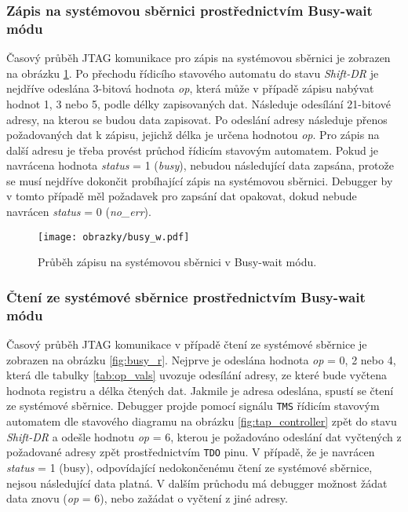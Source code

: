 \subsubsection{Zápis na systémovou sběrnici prostřednictvím Busy-wait módu} 
Časový průběh JTAG komunikace pro zápis na systémovou sběrnici je zobrazen na obrázku \ref{fig:busy_w}. Po přechodu řídicího stavového automatu do stavu \textit{Shift-DR} je nejdříve odeslána 3-bitová hodnota \textit{op}, která může v případě zápisu nabývat hodnot 1, 3 nebo 5, podle délky zapisovaných dat. Následuje odesílání 21-bitové adresy, na kterou se budou data zapisovat. Po odeslání adresy následuje přenos požadovaných dat k zápisu, jejichž délka je určena hodnotou \textit{op}. Pro zápis na další adresu je třeba provést průchod řídicím stavovým automatem. Pokud je navrácena hodnota \textit{status} = 1 (\textit{busy}), nebudou následující data zapsána, protože se musí nejdříve dokončit probíhající zápis na systémovou sběrnici. Debugger by v tomto případě měl požadavek pro zapsání dat opakovat, dokud nebude navrácen \textit{status} = 0 (\textit{no\_err}).

\begin{figure}[H]
  \begin{center}
    \texttt{[image: obrazky/busy\_w.pdf]}
  \end{center}
  \caption{Průběh zápisu na systémovou sběrnici v Busy-wait módu.}
	\label{fig:busy_w}
\end{figure}

\subsubsection{Čtení ze systémové sběrnice prostřednictvím Busy-wait módu} 
Časový průběh JTAG komunikace v případě čtení ze systémové sběrnice je zobrazen na obrázku \ref{fig:busy_r}. Nejprve je odeslána hodnota \textit{op} = 0, 2 nebo 4, která dle tabulky \ref{tab:op_vals} uvozuje odesílání adresy, ze které bude vyčtena hodnota registru a délka čtených dat. Jakmile je adresa odeslána, spustí se čtení ze systémové sběrnice. Debugger projde pomocí signálu \texttt{\acs{TMS}} řídicím stavovým automatem dle stavového diagramu na obrázku \ref{fig:tap_controller} zpět do stavu \textit{Shift-DR} a odešle hodnotu \textit{op} = 6, kterou je požadováno odeslání dat vyčtených z požadované adresy zpět prostřednictvím \texttt{\acs{TDO}} pinu. V případě, že je navrácen \textit{status} = 1 (busy), odpovídající nedokončenému čtení ze systémové sběrnice, nejsou následující data platná. V dalším průchodu má debugger možnost žádat data znovu (\textit{op} = 6), nebo zažádat o vyčtení z jiné adresy.

